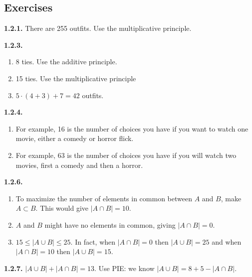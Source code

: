 \documentclass[12pt,]{book}
\theoremstyle{plain}
\theoremstyle{definition}
\theoremstyle{definition}
\theoremstyle{definition}
\numberwithin{equation}{chapter}
\newcommand{\card}[1]{\left| #1 \right|}
\begin{document}
\subsection*{ Exercises}
\noindent\textbf{1.2.1.} \hypertarget{p-776}{}%
There are 255 outfits. Use the multiplicative principle.%
\par\smallskip
\noindent\textbf{1.2.3.} \hypertarget{p-783}{}%
\leavevmode%
\begin{enumerate}[label=(\alph*)]
\item\hypertarget{li-350}{}\hypertarget{p-784}{}%
8 ties.  Use the additive principle.%
\item\hypertarget{li-351}{}15 ties. Use the multiplicative principle%
\item\hypertarget{li-352}{}\(5\cdot (4+3) + 7 = 42\) outfits.%
\end{enumerate}
%
\par\smallskip
\noindent\textbf{1.2.4.} \hypertarget{p-788}{}%
\leavevmode%
\begin{enumerate}[label=(\alph*)]
\item\hypertarget{li-355}{}\hypertarget{p-789}{}%
For example, 16 is the number of choices you have if you want to watch one movie, either a comedy or horror flick.%
\item\hypertarget{li-356}{}\hypertarget{p-790}{}%
For example, 63 is the number of choices you have if you will watch two movies, first a comedy and then a horror.%
\end{enumerate}
%
\par\smallskip
\noindent\textbf{1.2.6.} \hypertarget{p-797}{}%
\leavevmode%
\begin{enumerate}[label=(\alph*)]
\item\hypertarget{li-364}{}To maximize the number of elements in common between \(A\) and \(B\), make \(A \subset B\).  This would give \(\card{A \cap B} = 10\).%
\item\hypertarget{li-365}{}\(A\) and \(B\) might have no elements in common, giving \(\card{A\cap B} = 0\).%
\item\hypertarget{li-366}{}\(15 \le \card{A \cup B} \le 25\).  In fact, when \(\card{A \cap B} = 0\) then \(\card{A \cup B} = 25\) and when \(\card{A \cap B} = 10\) then \(\card{A \cup B} = 15\).%
\end{enumerate}
%
\par\smallskip
\noindent\textbf{1.2.7.} \hypertarget{p-799}{}%
\(\card{A \cup B} + \card{A \cap B} = 13\).  Use PIE: we know \(\card{A \cup B} = 8 + 5 - \card{A \cap B}\).%
\par\smallskip
\end{document}
